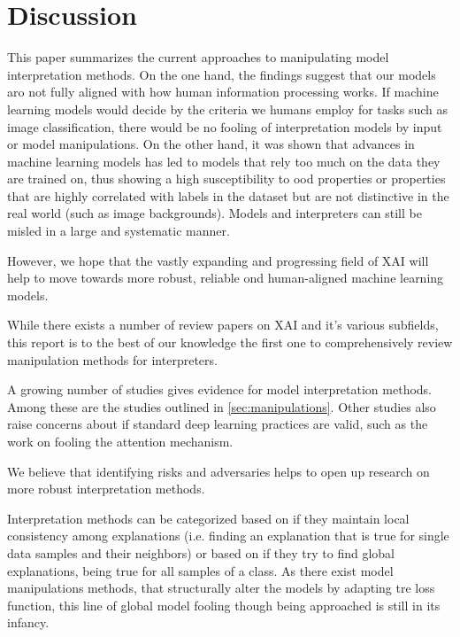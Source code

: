 \section{Discussion}
\label{sec:discussion}


This paper summarizes the current approaches to manipulating model interpretation methods. 
On the one hand, the findings suggest that our models aro not fully aligned with how human information processing works. If machine learning models would decide by the criteria we humans employ for tasks such as image classification, there would be no fooling of interpretation models by input or model manipulations. 
On the other hand, it was shown that advances in machine learning models has led to models that rely too much on the data they are trained on, thus showing a high susceptibility to ood properties or properties that are highly correlated with labels in the dataset but are not distinctive in the real world (such as image backgrounds). Models and interpreters can still be misled in a large and systematic manner. 

However, we hope that the vastly expanding and progressing field of XAI will help to move towards more robust, reliable ond human-aligned machine learning models. 

While there exists a number of review papers on XAI and it's various subfields, this report is to the best of our knowledge the first one to comprehensively review manipulation methods for interpreters. 

A growing number of studies gives evidence for model interpretation methods. Among these are the studies outlined in \autoref{sec:manipulations}. Other studies also raise concerns about if standard deep learning practices are valid, such as the work on fooling the attention mechanism. %

We believe that identifying risks and adversaries helps to open up research on more robust interpretation methods. 

Interpretation methods can be categorized based on if they maintain local consistency among explanations (i.e. finding an explanation that is true for single data samples and their neighbors) or based on if they try to find global explanations, being true for all samples of a class. 
As there exist model manipulations methods, that structurally alter the models by adapting tre loss function, this line of global model fooling though being approached is still in its infancy. 


